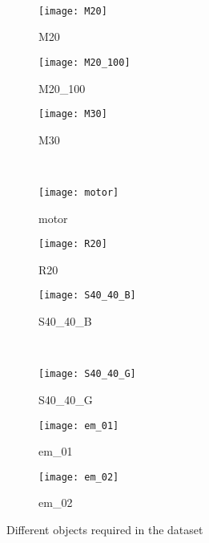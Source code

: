 \documentclass[paper=a4,11pt,parskip=half,toc=listof]{scrartcl}
\begin{document}
\begin{figure}[!htb]
\begin{subfigure}{.3\textwidth}
\end{subfigure}\\
\vspace{3mm}
\begin{subfigure}{.3\textwidth}
  \centering
  \texttt{[image: M20]}
  \caption{M20 \cite{github_robocup@work}}
  \label{fig:M20}
\end{subfigure}
\begin{subfigure}{.3\textwidth}
  \centering
  \texttt{[image: M20\_100]}
  \caption{M20\_100 \cite{github_robocup@work}}
  \label{fig:M20_100}
\end{subfigure}
\begin{subfigure}{.3\textwidth}
  \centering
  \texttt{[image: M30]}
  \caption{M30 \cite{github_robocup@work}}
  \label{fig:M30}
\end{subfigure}\\
\vspace{3mm}
\begin{subfigure}{.3\textwidth}
  \centering
  \texttt{[image: motor]}
  \caption{motor \cite{github_robocup@work}}
  \label{fig:motor}
\end{subfigure}
\begin{subfigure}{.3\textwidth}
  \centering
  \texttt{[image: R20]}
  \caption{R20 \cite{github_robocup@work}}
  \label{fig:R20}
\end{subfigure}
\begin{subfigure}{.3\textwidth}
  \centering
  \texttt{[image: S40\_40\_B]}
  \caption{S40\_40\_B \cite{github_robocup@work}}
  \label{fig:S40_40_B}
\end{subfigure}\\
\vspace{3mm}
\begin{subfigure}{.3\textwidth}
  \centering
  \texttt{[image: S40\_40\_G]}
  \caption{S40\_40\_G \cite{github_robocup@work}}
  \label{fig:S40_40_G}
\end{subfigure}
\begin{subfigure}{.3\textwidth}
  \centering
  \texttt{[image: em\_01]}
  \caption{em\_01}
  \label{fig:em_01}
\end{subfigure}
\begin{subfigure}{.3\textwidth}
  \centering
  \texttt{[image: em\_02]}
  \caption{em\_02}
  \label{fig:em_02}
\end{subfigure}
\caption{Different objects required in the dataset}
\label{Fig:1}
\end{figure}
\end{document}
